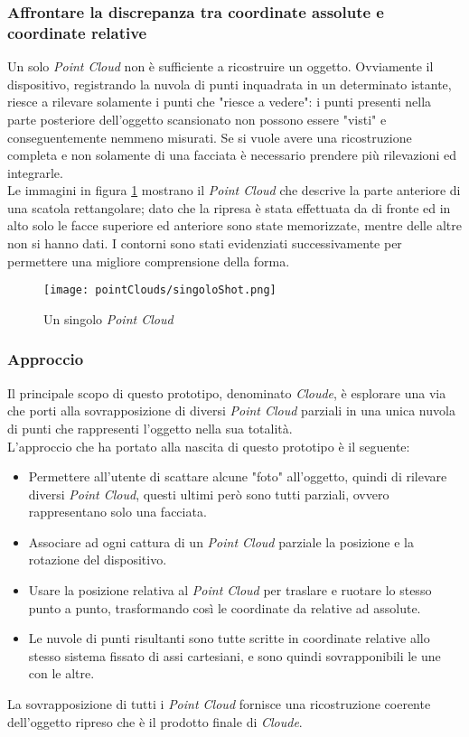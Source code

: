 \subsubsection{Affrontare la discrepanza tra coordinate assolute e coordinate relative}
Un solo \emph{Point Cloud} non è sufficiente a ricostruire un oggetto. Ovviamente il dispositivo, registrando la nuvola di punti inquadrata in un determinato istante, riesce a rilevare solamente i punti che "riesce a vedere": i punti presenti nella parte posteriore dell'oggetto scansionato non possono essere "visti" e conseguentemente nemmeno misurati. Se si vuole avere una ricostruzione completa e non solamente di una facciata è necessario prendere più rilevazioni ed integrarle.\\
Le immagini in figura \ref{figure:singolo_pointCloud} mostrano il \emph{Point Cloud} che descrive la parte anteriore di una scatola rettangolare; dato che la ripresa è stata effettuata da di fronte ed in alto solo le facce superiore ed anteriore sono state memorizzate, mentre delle altre non si hanno dati. I contorni sono stati evidenziati successivamente per permettere una migliore comprensione della forma.
\begin{figure}[H] 
    \centering 
    \texttt{[image: pointClouds/singoloShot.png]} 
    \caption{Un singolo \emph{Point Cloud}}
    \label{figure:singolo_pointCloud}
\end{figure}
\subsubsection{Approccio}
Il principale scopo di questo prototipo, denominato \emph{Cloude}, è esplorare una via che porti alla sovrapposizione di diversi \emph{Point Cloud} parziali in una unica nuvola di punti che rappresenti l'oggetto nella sua totalità.\\
L'approccio che ha portato alla nascita di questo prototipo è il seguente:
\begin{itemize}
	\item Permettere all'utente di scattare alcune "foto" all'oggetto, quindi di rilevare diversi \emph{Point Cloud}, questi ultimi però sono tutti parziali, ovvero rappresentano solo una facciata.
	\item Associare ad ogni cattura di un \emph{Point Cloud} parziale la posizione e la rotazione del dispositivo.
	\item Usare la posizione relativa al \emph{Point Cloud} per traslare e ruotare lo stesso punto a punto, trasformando così le coordinate da relative ad assolute.
	\item Le nuvole di punti risultanti sono tutte scritte in coordinate relative allo stesso sistema fissato di assi cartesiani, e sono quindi sovrapponibili le une con le altre.
\end{itemize}
La sovrapposizione di tutti i \emph{Point Cloud} fornisce una ricostruzione coerente dell'oggetto ripreso che è il prodotto finale di \emph{Cloude}.

